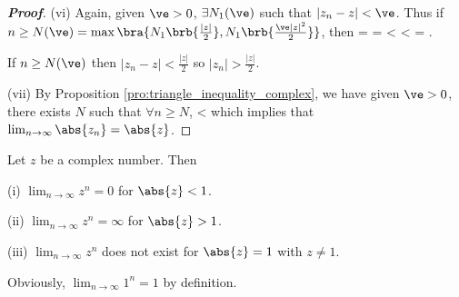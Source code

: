 \begin{proof}[\bf Proof]
\item [(vi)] Again, given $\ve > 0$, $\exists N_1(\ve)$ such that $|z_n - z| < \ve$. Thus if $n \geq N(\ve) = \max\bra{N_1\brb{\frac{|z|}{2}}, N_1\brb{\frac{\ve|z|^2}{2}}}$, then
\be
{} =  =  < < \cdot {} = \ve.
\ee

If $n \geq N(\ve)$ then $|z_n - z| < \frac{|z|}{2}$ so $|z_n| > \frac{|z|}{2}$.

\item [(vii)] By Proposition \ref{pro:triangle_inequality_complex}, we have given $\ve>0$, there exists $N$ such that $\forall n\geq N$,
\be
{} \leq {} <\ve
\ee
which implies that $\lim_{n\to \infty}\abs{z_n} = \abs{z}$.
\een
\end{proof}

\begin{proposition}\label{pro:convergence_of_complex_power_function}
Let $z$ be a complex number. Then
\ben
\item [(i)] $\lim_{n\to \infty} z^n = 0$ for $\abs{z} <1$.
\item [(ii)] $\lim_{n\to \infty} z^n = \infty$ for $\abs{z}>1$.
\item [(iii)] $\lim_{n\to \infty} z^n$ does not exist for $\abs{z}=1$ with $z\neq 1$.
\een
\end{proposition}

\begin{remark}
Obviously, $\lim_{n\to \infty} 1^n = 1$ by definition.
\end{remark}

